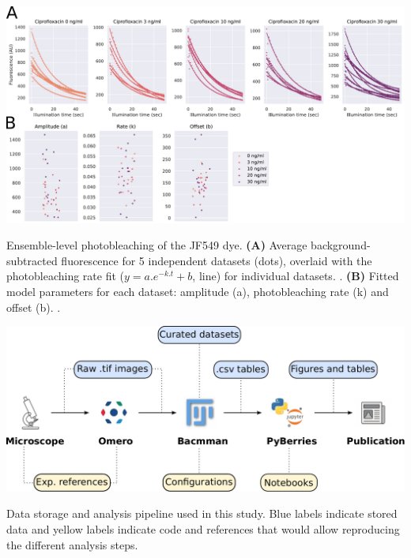 \begin{suppfigure*}[htbp]
    \begin{center}
    \includegraphics[width=\textwidth]{SI_Figures/SIFig_bleaching.pdf}
    \end{center}
    \caption{Ensemble-level photobleaching of the JF549 dye. \textbf{(A)} Average background-subtracted fluorescence for 5 independent datasets (dots), overlaid with the photobleaching rate fit ($y=a.e^{-k.t}+b$, line) for individual datasets. . \textbf{(B)} Fitted model parameters for each dataset: amplitude (a), photobleaching rate (k) and offset (b). .}
    \label{SIFig:dye_bleaching}
\end{suppfigure*}

\begin{suppfigure*}[htbp]
\begin{center}
\includegraphics[width=\textwidth]{SI_Figures/Data_analysis_workflow.pdf}
\end{center}
\caption{Data storage and analysis pipeline used in this study. Blue labels indicate stored data and yellow labels indicate code and references that would allow reproducing the different analysis steps.}
\label{SIFig:analysis_workflow}
\end{suppfigure*}

